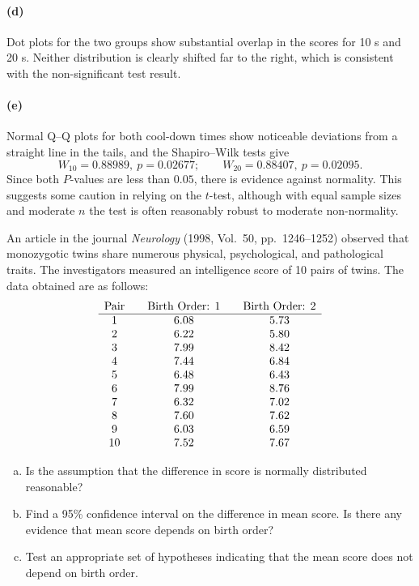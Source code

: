 \documentclass[answers,12pt,addpoints]{exam}
\begin{document}
\begin{questions}
\begin{solution}
\paragraph{(d)}
Dot plots for the two groups show substantial overlap in the scores for 10 s and 20 s. Neither distribution is clearly shifted far to the right, which is consistent with the non-significant test result.

\paragraph{(e)}
Normal Q--Q plots for both cool-down times show noticeable deviations from a straight line in the tails, and the Shapiro--Wilk tests give
\[
W_{10} = 0.88989,\ p = 0.02677;\qquad
W_{20} = 0.88407,\ p = 0.02095.
\]
Since both $P$-values are less than $0.05$, there is evidence against normality. This suggests some caution in relying on the $t$-test, although with equal sample sizes and moderate $n$ the test is often reasonably robust to moderate non-normality.
\end{solution}



An article in the journal \textit{Neurology} (1998, Vol.~50, pp.~1246--1252) observed that monozygotic twins share numerous physical, psychological, and pathological traits. The investigators measured an intelligence score of 10 pairs of twins. The data obtained are as follows:
\[
\begin{array}{c@{\qquad}c@{\qquad}c}
\text{Pair} & \text{Birth Order: 1} & \text{Birth Order: 2} \\
\hline
1 & 6.08 & 5.73 \\
2 & 6.22 & 5.80 \\
3 & 7.99 & 8.42 \\
4 & 7.44 & 6.84 \\
5 & 6.48 & 6.43 \\
6 & 7.99 & 8.76 \\
7 & 6.32 & 7.02 \\
8 & 7.60 & 7.62 \\
9 & 6.03 & 6.59 \\
10 & 7.52 & 7.67
\end{array}
\]

\begin{enumerate}[(a)]
\item Is the assumption that the difference in score is normally distributed reasonable?
\item Find a 95\% confidence interval on the difference in mean score. Is there any evidence that mean score depends on birth order?
\item Test an appropriate set of hypotheses indicating that the mean score does not depend on birth order.
\end{enumerate}


\end{questions}
\end{document}

